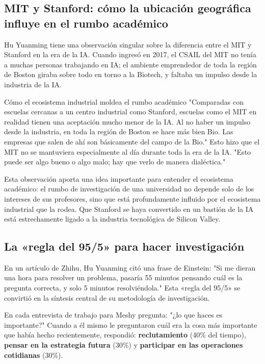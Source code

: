 \documentclass[a4paper]{article}
\begin{document}
\subsection{MIT y Stanford: cómo la ubicación geográfica influye en el rumbo académico}

Hu Yuanming tiene una observación singular sobre la diferencia entre el MIT y Stanford en la era de la IA. Cuando ingresó en 2017, el CSAIL del MIT no tenía a muchas personas trabajando en IA; el ambiente emprendedor de toda la región de Boston giraba sobre todo en torno a la Biotech, y faltaba un impulso desde la industria de la IA.

\begin{knowledgebox}{Cómo el ecosistema industrial moldea el rumbo académico}
"Comparadas con escuelas cercanas a un centro industrial como Stanford, escuelas como el MIT en realidad tienen una aceptación mucho menor de la IA. Al no haber un impulso desde la industria, en toda la región de Boston se hace más bien Bio. Las empresas que salen de ahí son básicamente del campo de la Bio." Esto hizo que el MIT no se mantuviera especialmente al día durante toda la era de la IA. "Esto puede ser algo bueno o algo malo; hay que verlo de manera dialéctica."
\end{knowledgebox}

Esta observación aporta una idea importante para entender el ecosistema académico: el rumbo de investigación de una universidad no depende solo de los intereses de sus profesores, sino que está profundamente influido por el ecosistema industrial que la rodea. Que Stanford se haya convertido en un bastión de la IA está estrechamente ligado a la industria tecnológica de Silicon Valley.

\subsection{La «regla del 95/5» para hacer investigación}

En un artículo de Zhihu, Hu Yuanming citó una frase de Einstein: "Si me dieran una hora para resolver un problema, pasaría 55 minutos pensando cuál es la pregunta correcta, y solo 5 minutos resolviéndola." Esta «regla del 95/5» se convirtió en la síntesis central de su metodología de investigación.

En cada entrevista de trabajo para Meshy pregunta: "¿lo que haces es importante?" Cuando a él mismo le preguntaron cuál era la cosa más importante que había hecho recientemente, respondió: \textbf{reclutamiento} (40\% del tiempo), \textbf{pensar en la estrategia futura} (30\%) y \textbf{participar en las operaciones cotidianas} (30\%).
\end{document}

